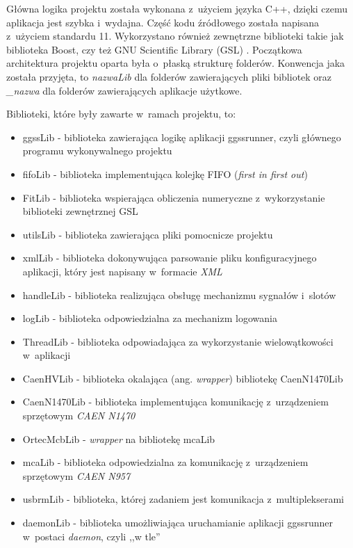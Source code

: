Główna logika projektu została wykonana z~użyciem języka C++, dzięki czemu aplikacja jest szybka i~wydajna. Część kodu źródłowego została napisana z~użyciem standardu 11. Wykorzystano również zewnętrzne biblioteki takie jak biblioteka Boost, czy też GNU Scientific Library (GSL) \cite{GSLMain} . Początkowa architektura projektu oparta była o~płaską strukturę folderów. Konwencja jaka została przyjęta, to \textit{nazwaLib} dla folderów zawierających pliki bibliotek oraz \textit{\_nazwa} dla folderów zawierających aplikacje użytkowe.\par
\bigskip
Biblioteki, które były zawarte w~ramach projektu, to:
\begin{itemize}
\item ggssLib - biblioteka zawierająca logikę aplikacji ggssrunner, czyli głównego programu wykonywalnego projektu
\item fifoLib - biblioteka implementująca kolejkę FIFO (\textit{first in first out})
\item FitLib - biblioteka wspierająca obliczenia numeryczne z~wykorzystanie biblioteki zewnętrznej GSL
\item utilsLib - biblioteka zawierająca pliki pomocnicze projektu
\item xmlLib - biblioteka dokonywująca parsowanie pliku konfiguracyjnego aplikacji, który jest napisany w~formacie \textit{XML}
\item handleLib - biblioteka realizująca obsługę mechanizmu sygnałów i~slotów
\item logLib - biblioteka odpowiedzialna za mechanizm logowania
\item ThreadLib - biblioteka odpowiadająca za wykorzystanie wielowątkowości w~aplikacji
\item CaenHVLib - biblioteka okalająca (ang. \textit{wrapper}) bibliotekę CaenN1470Lib
\item CaenN1470Lib - biblioteka implementująca komunikację z~urządzeniem sprzętowym \textit{CAEN N1470}
\item OrtecMcbLib - \textit{wrapper} na bibliotekę mcaLib
\item mcaLib - biblioteka odpowiedzialna za komunikację z~urządzeniem sprzętowym \textit{CAEN N957}
\item usbrmLib - biblioteka, której zadaniem jest komunikacja z~multiplekserami
\item daemonLib - biblioteka umożliwiająca uruchamianie aplikacji ggssrunner w~postaci \textit{daemon}, czyli ,,w tle'' 
\end{itemize}

